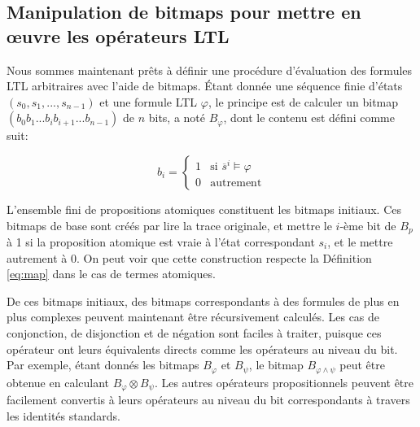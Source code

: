 \subsection{Manipulation de bitmaps pour mettre en \oe{}uvre les opérateurs LTL} %

Nous sommes maintenant prêts à définir une procédure d'évaluation des formules LTL arbitraires avec l'aide de bitmaps. Étant donnée une séquence finie d'états $(s_0, s_1, ..., s_{n - 1})$ et une formule LTL $\varphi$, le principe est de calculer un bitmap $(b_0b_1...b_ib_{i + 1}...b_{n - 1})$ de $n$ bits, a noté $B_\varphi$, dont le contenu est défini comme suit:

\begin{equation}\label{eq:map}
b_i = \begin{cases}
1 & \text{si $\overline{s}^i \models \varphi$} \\
0 & \text{autrement}
\end{cases}
\end{equation}

L'ensemble fini de propositions atomiques constituent les bitmaps initiaux. Ces bitmaps de base sont créés par lire la trace originale, et mettre le $i$-ème bit de $B_p$ à 1 si la proposition atomique est vraie à l'état correspondant $s_i$, et le mettre autrement à 0. On peut voir que cette construction respecte la Définition \ref{eq:map} dans le cas de termes atomiques.

De ces bitmaps initiaux, des bitmaps correspondants à des formules de plus en plus complexes peuvent maintenant être récursivement calculés. Les cas de conjonction, de disjonction et de négation sont faciles à traiter, puisque ces opérateur ont leurs équivalents directs comme les opérateurs au niveau du bit. Par exemple, étant donnés les bitmaps $B_\varphi$ et $B_\psi$, le bitmap $B_{\varphi \wedge \psi}$ peut être obtenue en calculant $B_\varphi \otimes B_\psi$. Les autres opérateurs propositionnels peuvent être facilement convertis à leurs opérateurs au niveau du bit correspondants à travers les identités standards.

%

